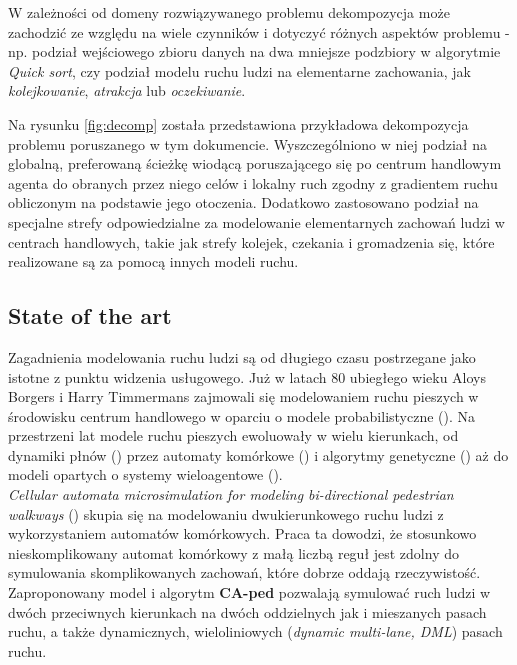 \documentclass[a4paper, 12pt]{article}
\begin{document}
W zależności od domeny rozwiązywanego problemu dekompozycja może zachodzić ze względu na wiele czynników i dotyczyć różnych aspektów problemu - np. podział wejściowego zbioru danych na dwa mniejsze podzbiory w algorytmie \emph{Quick sort}, czy podział modelu ruchu ludzi na elementarne zachowania, jak \emph{kolejkowanie}, \emph{atrakcja} lub \emph{oczekiwanie}.

Na rysunku \ref{fig:decomp} została przedstawiona przykładowa dekompozycja problemu poruszanego w tym dokumencie. Wyszczególniono w niej podział na globalną, preferowaną ścieżkę wiodącą poruszającego się po centrum handlowym agenta do obranych przez niego celów i lokalny ruch zgodny z gradientem ruchu obliczonym na podstawie jego otoczenia. Dodatkowo zastosowano podział na specjalne strefy odpowiedzialne za modelowanie elementarnych zachowań ludzi w centrach handlowych, takie jak strefy kolejek, czekania i gromadzenia się, które realizowane są za pomocą innych modeli ruchu.

\newpage
    \subsection{State of the art}
    \label{sec:sota}

\noindent
Zagadnienia modelowania ruchu ludzi są od długiego czasu postrzegane jako istotne z punktu widzenia usługowego. Już w latach 80 ubiegłego wieku Aloys Borgers i Harry Timmermans zajmowali się modelowaniem ruchu pieszych w środowisku centrum handlowego w oparciu o modele probabilistyczne (\cite{refs:route-choice-1}).
Na przestrzeni lat modele ruchu pieszych ewoluowały w wielu kierunkach, od dynamiki płnów (\cite{refs:fluid-dynamics}) przez automaty komórkowe (\cite{refs:cellular-movement}) i algorytmy genetyczne (\cite{refs:pedestrian-behaviour-2}) aż do modeli opartych o systemy wieloagentowe (\cite{refs:real-data-2}). \\

\emph{Cellular automata microsimulation for modeling bi-directional pedestrian walkways} \linebreak (\cite{refs:cellular-movement}) skupia się na modelowaniu dwukierunkowego ruchu ludzi z wykorzystaniem automatów komórkowych. Praca ta dowodzi, że stosunkowo nieskomplikowany automat komórkowy z małą liczbą reguł jest zdolny do symulowania skomplikowanych zachowań, które dobrze oddają rzeczywistość. Zaproponowany model i algorytm \textbf{CA-ped} pozwalają symulować ruch ludzi w dwóch przeciwnych kierunkach na dwóch oddzielnych jak i mieszanych pasach ruchu, a także dynamicznych, wieloliniowych (\emph{dynamic multi-lane, DML}) pasach ruchu.
\end{document}
